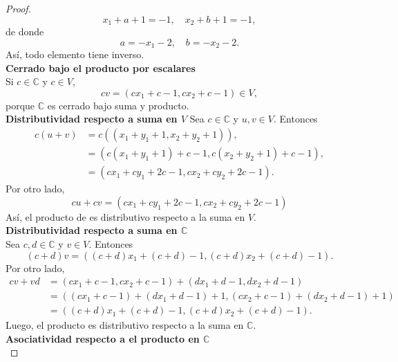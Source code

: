\documentclass[12pt,a4paper]{article}
\begin{document}
\begin{proof}
        \begin{equation*}
            x_{1}+a+1=-1,\quad x_{2}+b+1=-1,
        \end{equation*}
        de donde
        \begin{equation*}
            a=-x_{1}-2,\quad b=-x_{2}-2.
        \end{equation*}
        Así, todo elemento tiene inverso.\\
        \textbf{Cerrado bajo el producto por escalares}\\
        Si $c\in\mathbb{C}$ y $c\in V$,
        \begin{equation*}
            cv=(cx_{1}+c-1,cx_{2}+c-1)\in V,
        \end{equation*}
        porque $\mathbb{C}$ es cerrado bajo suma y producto.\\
        \textbf{Distributividad respecto a suma en $V$}
        Sea $c\in\mathbb{C}$ y $u,v\in V$. Entonces
        \begin{align*}
            c(u+v)&=c((x_{1}+y_{1}+1,x_{2}+y_{2}+1)),\\
            &=(c(x_{1}+y_{1}+1)+c-1,c(x_{2}+y_{2}+1)+c-1),\\
            &=(cx_{1}+cy_{1}+2c-1,cx_{2}+cy_{2}+2c-1).
        \end{align*}
        Por otro lado,
        \begin{equation*}
            cu+cv=(cx_{1}+cy_{1}+2c-1,cx_{2}+cy_{2}+2c-1)
        \end{equation*}
        Así, el producto de es distributivo respecto a la suma en $V$.\\
        \textbf{Distributividad respecto a suma en $\mathbb{C}$}\\
        Sea $c,d\in\mathbb{C}$ y $v\in V$. Entonces
        \begin{equation*}
            (c+d)v=((c+d)x_{1}+(c+d)-1,(c+d)x_{2}+(c+d)-1).
        \end{equation*}
        Por otro lado,
        \begin{align*}
            cv+vd&=(cx_{1}+c-1,cx_{2}+c-1)+(dx_{1}+d-1,dx_{2}+d-1)\\
            &=((cx_{1}+c-1)+(dx_{1}+d-1)+1,(cx_{2}+c-1)+(dx_{2}+d-1)+1)\\
            &=((c+d)x_{1}+(c+d)-1,(c+d)x_{2}+(c+d)-1).
        \end{align*}
        Luego, el producto es distributivo respecto a la suma en $\mathbb{C}$.\\
        \textbf{Asociatividad respecto a el producto en $\mathbb{C}$}\\

\end{proof}
\end{document}
